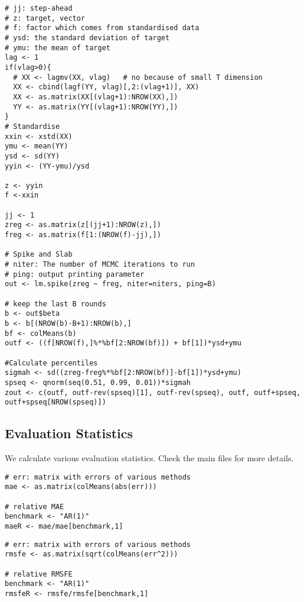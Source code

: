 \documentclass[12pt]{article}
\begin{document}
\begin{lstlisting}[title=\textbf{Spike and Slab Regression.}]
# jj: step-ahead
# z: target, vector
# f: factor which comes from standardised data
# ysd: the standard deviation of target
# ymu: the mean of target
lag <- 1
if(vlag>0){
  # XX <- lagmv(XX, vlag)   # no because of small T dimension
  XX <- cbind(lagf(YY, vlag)[,2:(vlag+1)], XX)
  XX <- as.matrix(XX[(vlag+1):NROW(XX),])
  YY <- as.matrix(YY[(vlag+1):NROW(YY),])
}
# Standardise
xxin <- xstd(XX)
ymu <- mean(YY)
ysd <- sd(YY)
yyin <- (YY-ymu)/ysd

z <- yyin
f <-xxin

jj <- 1
zreg <- as.matrix(z[(jj+1):NROW(z),])
freg <- as.matrix(f[1:(NROW(f)-jj),])

# Spike and Slab
# niter: The number of MCMC iterations to run
# ping: output printing parameter
out <- lm.spike(zreg ~ freg, niter=niters, ping=B)

# keep the last B rounds
b <- out$beta
b <- b[(NROW(b)-B+1):NROW(b),]
bf <- colMeans(b)
outf <- ((f[NROW(f),]%*%bf[2:NROW(bf)]) + bf[1])*ysd+ymu

#Calculate percentiles
sigmah <- sd((zreg-freg%*%bf[2:NROW(bf)]-bf[1])*ysd+ymu)
spseq <- qnorm(seq(0.51, 0.99, 0.01))*sigmah
zout <- c(outf, outf-rev(spseq)[1], outf-rev(spseq), outf, outf+spseq, outf+spseq[NROW(spseq)])
\end{lstlisting}

\subsection{Evaluation Statistics}

We calculate various evaluation statistics. Check the main files for more details.

\begin{lstlisting}[title=\textbf{Mean Absolute Error.}]
# err: matrix with errors of various methods
mae <- as.matrix(colMeans(abs(err)))

# relative MAE
benchmark <- "AR(1)"
maeR <- mae/mae[benchmark,1]
\end{lstlisting}

\begin{lstlisting}[title=\textbf{Root Mean Squared Forecast Error.}]
# err: matrix with errors of various methods
rmsfe <- as.matrix(sqrt(colMeans(err^2)))

# relative RMSFE
benchmark <- "AR(1)"
rmsfeR <- rmsfe/rmsfe[benchmark,1]
\end{lstlisting}
\end{document}
